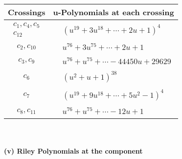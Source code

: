 \documentclass[1p]{elsarticle_modified}
\theoremstyle{definition}
\begin{document}
\begin{tabular}{m{50pt}|m{274pt}}
Crossings & \hspace{64pt}u-Polynomials at each crossing \\
\hline $$\begin{aligned}c_{1},c_{4},c_{5}\\c_{12}\end{aligned}$$&$\begin{aligned}
&(u^{19}+3 u^{18}+\cdots+2 u+1)^{4}
\end{aligned}$\\
\hline $$\begin{aligned}c_{2},c_{10}\end{aligned}$$&$\begin{aligned}
&u^{76}+3 u^{75}+\cdots+2 u+1
\end{aligned}$\\
\hline $$\begin{aligned}c_{3},c_{9}\end{aligned}$$&$\begin{aligned}
&u^{76}+u^{75}+\cdots-44450 u+29629
\end{aligned}$\\
\hline $$\begin{aligned}c_{6}\end{aligned}$$&$\begin{aligned}
&(u^2+u+1)^{38}
\end{aligned}$\\
\hline $$\begin{aligned}c_{7}\end{aligned}$$&$\begin{aligned}
&(u^{19}+9 u^{18}+\cdots+5 u^2-1)^{4}
\end{aligned}$\\
\hline $$\begin{aligned}c_{8},c_{11}\end{aligned}$$&$\begin{aligned}
&u^{76}+u^{75}+\cdots-12 u+1
\end{aligned}$\\
\hline
\end{tabular}\\~\\
\newpage\renewcommand{\arraystretch}{1}
\flushleft \textbf{(v) Riley Polynomials at the component}\newline \\
\end{document}
